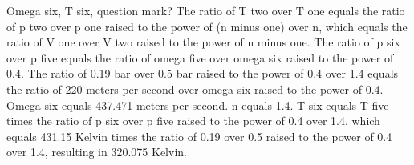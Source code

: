 Omega six, T six, question mark?
The ratio of T two over T one equals the ratio of p two over p one raised to the power of (n minus one) over n, which equals the ratio of V one over V two raised to the power of n minus one.
The ratio of p six over p five equals the ratio of omega five over omega six raised to the power of 0.4.
The ratio of 0.19 bar over 0.5 bar raised to the power of 0.4 over 1.4 equals the ratio of 220 meters per second over omega six raised to the power of 0.4.
Omega six equals 437.471 meters per second.
n equals 1.4.
T six equals T five times the ratio of p six over p five raised to the power of 0.4 over 1.4, which equals 431.15 Kelvin times the ratio of 0.19 over 0.5 raised to the power of 0.4 over 1.4, resulting in 320.075 Kelvin.